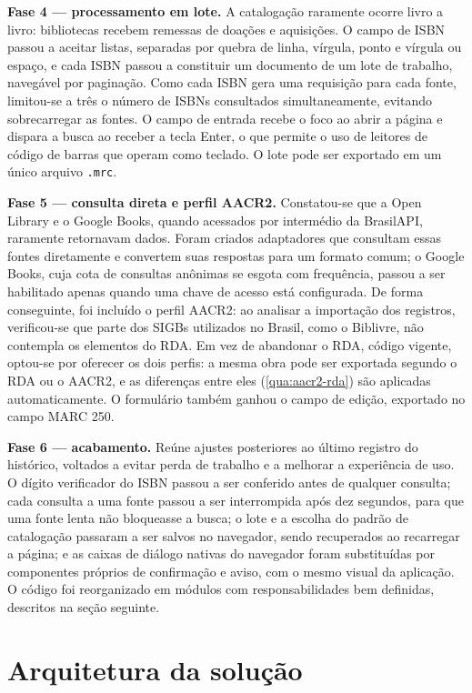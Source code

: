 \textbf{Fase 4 --- processamento em lote.} A catalogação raramente ocorre livro a livro: bibliotecas recebem remessas de doações e aquisições. O campo de ISBN passou a aceitar listas, separadas por quebra de linha, vírgula, ponto e vírgula ou espaço, e cada ISBN passou a constituir um documento de um lote de trabalho, navegável por paginação. Como cada ISBN gera uma requisição para cada fonte, limitou-se a três o número de ISBNs consultados simultaneamente, evitando sobrecarregar as fontes. O campo de entrada recebe o foco ao abrir a página e dispara a busca ao receber a tecla Enter, o que permite o uso de leitores de código de barras que operam como teclado. O lote pode ser exportado em um único arquivo \texttt{.mrc}.

\textbf{Fase 5 --- consulta direta e perfil AACR2.} Constatou-se que a Open Library e o Google Books, quando acessados por intermédio da BrasilAPI, raramente retornavam dados. Foram criados adaptadores que consultam essas fontes diretamente e convertem suas respostas para um formato comum; o Google Books, cuja cota de consultas anônimas se esgota com frequência, passou a ser habilitado apenas quando uma chave de acesso está configurada. De forma conseguinte, foi incluído o perfil AACR2: ao analisar a importação dos registros, verificou-se que parte dos SIGBs utilizados no Brasil, como o Biblivre, não contempla os elementos do RDA. Em vez de abandonar o RDA, código vigente, optou-se por oferecer os dois perfis: a mesma obra pode ser exportada segundo o RDA ou o AACR2, e as diferenças entre eles (\autoref{qua:aacr2-rda}) são aplicadas automaticamente. O formulário também ganhou o campo de edição, exportado no campo MARC 250.

\textbf{Fase 6 --- acabamento.} Reúne ajustes posteriores ao último registro do histórico, voltados a evitar perda de trabalho e a melhorar a experiência de uso. O dígito verificador do ISBN passou a ser conferido antes de qualquer consulta; cada consulta a uma fonte passou a ser interrompida após dez segundos, para que uma fonte lenta não bloqueasse a busca; o lote e a escolha do padrão de catalogação passaram a ser salvos no navegador, sendo recuperados ao recarregar a página; e as caixas de diálogo nativas do navegador foram substituídas por componentes próprios de confirmação e aviso, com o mesmo visual da aplicação. O código foi reorganizado em módulos com responsabilidades bem definidas, descritos na seção seguinte.

\section{Arquitetura da solução}
\label{sec:arquitetura}

